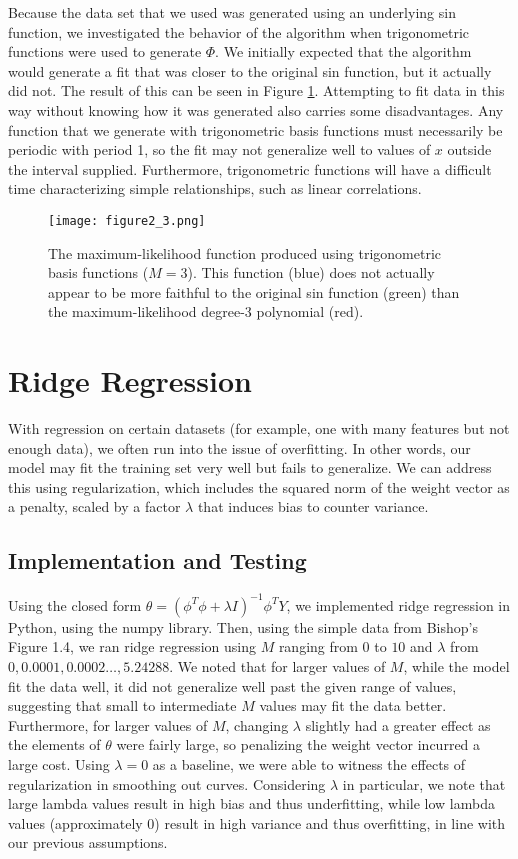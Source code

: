 \documentclass{article}
\begin{document}
Because the data set that we used was generated using an underlying sin function, we investigated the behavior of the algorithm when trigonometric functions were used to generate $\Phi$. We initially expected that the algorithm would generate a fit that was closer to the original sin function, but it actually did not. The result of this can be seen in Figure \ref{p2figure2}. Attempting to fit data in this way without knowing how it was generated also carries some disadvantages. Any function that we generate with trigonometric basis functions must necessarily be periodic with period 1, so the fit may not generalize well to values of $x$ outside the interval supplied. Furthermore, trigonometric functions will have a difficult time characterizing simple relationships, such as linear correlations.

\begin{figure}
\label{p2figure2}
\texttt{[image: figure2\_3.png]}
\caption{The maximum-likelihood function produced using trigonometric basis functions ($M=3$). This function (blue) does not actually appear to be more faithful to the original sin function (green) than the maximum-likelihood degree-3 polynomial (red).}
\end{figure}

\section{Ridge Regression}
With regression on certain datasets (for example, one with many features but not enough data), we often run into the issue of overfitting. In other words, our model may fit the training set very well but fails to generalize. We can address this using regularization, which includes the squared norm of the weight vector as a penalty, scaled by a factor $\lambda$ that induces bias to counter variance. 

\subsection{Implementation and Testing}
Using the closed form $\theta = (\phi ^ {T} \phi + \lambda I)^{-1} \phi ^ T Y$, we implemented ridge regression in Python, using the numpy library. Then, using the simple data from Bishop's Figure 1.4, we ran ridge regression using $M$ ranging from $0$ to $10$ and $\lambda$ from $0, 0.0001, 0.0002 \dots, 5.24288$. We noted that for larger values of $M$, while the model fit the data well, it did not generalize well past the given range of values, suggesting that small to intermediate $M$ values may fit the data better. Furthermore, for larger values of $M$, changing $\lambda$ slightly had a greater effect as the elements of $\theta$ were fairly large, so penalizing the weight vector incurred a large cost. Using $\lambda = 0$ as a baseline, we were able to witness the effects of regularization in smoothing out curves. Considering $\lambda$ in particular, we note that large lambda values result in high bias and thus underfitting, while low lambda values (approximately 0) result in high variance and thus overfitting, in line with our previous assumptions.
\end{document}
